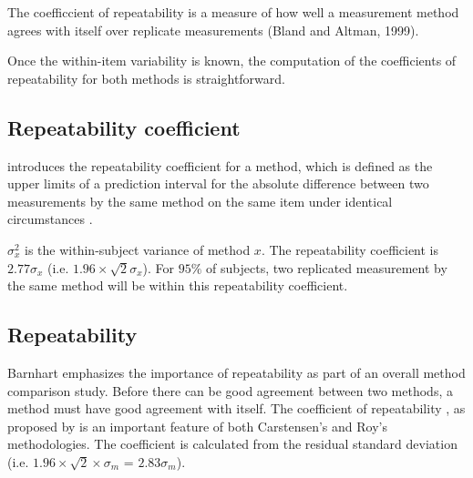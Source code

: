 \documentclass[Chap2cmain.tex]{subfiles}
\begin{document}
The coefficcient of repeatability is a measure of how well a measurement method agrees
with itself over replicate measurements (Bland and Altman, 1999). 
 
 Once the within-item variability is known, the computation of the coefficients of repeatability for both
 methods is straightforward.

\subsection{Repeatability coefficient}
\citet{BA99} introduces the repeatability coefficient for a method, which is defined as the upper limits of a prediction interval for the absolute difference between two measurements by the same
method on the same item under identical circumstances \citep{BXC2008}.

$\sigma^2_{x}$ is the within-subject variance of method $x$. The repeatability coefficient is $2.77 \sigma_{x}$ (i.e. $1.96 \times \sqrt{2} \sigma_{x}$). For $95\%$ of subjects, two replicated measurement by the same method will be within this repeatability coefficient.

\newpage

\newpage

\subsection{Repeatability}
Barnhart emphasizes the importance of repeatability as part of an overall method comparison study. Before there can be good agreement between two methods, a method must have good agreement with itself. The coefficient of repeatability , as proposed by \citet{BA99} is an important feature of both Carstensen's and Roy's methodologies. The coefficient is calculated from the residual standard deviation (i.e. $1.96 \times \sqrt{2} \times \sigma_m$ = $2.83 \sigma_m$).
\end{document}
